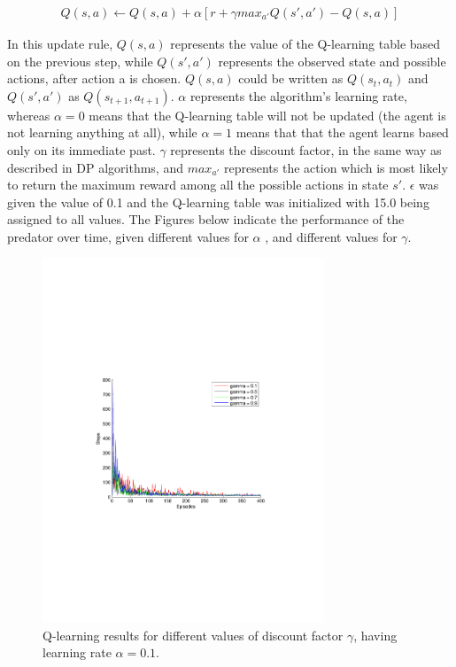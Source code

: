 \documentclass[a4paper,11pt]{article}
\begin{document}
\begin{align*}
Q(s,a) \leftarrow  Q(s,a) + \alpha \left[ r + \gamma  max_{a'} Q(s',a') - Q(s,a)\right]
\end{align*}

In this update rule, $Q(s,a)$ represents the value of the Q-learning table based on the previous step, while $Q(s',a')$ represents the observed state and possible actions, after action a is chosen. $Q(s,a)$ could be written as $Q(s_t,a_t)$ and $Q(s',a')$ as $Q(s_{t+1}, a_{t+1})$. $\alpha$ represents the algorithm's learning rate, whereas $\alpha =0$ means that the Q-learning table will not be updated (the agent is not learning anything at all), while $\alpha =1$ means that that the agent learns based only on its immediate past. $\gamma$ represents the discount factor, in the same way as described in DP algorithms, and $max_{a'}$ represents the action which is most likely to return the maximum reward among all the possible actions in state $s'$. $\epsilon$ was given the value of 0.1 and the Q-learning table was initialized with 15.0 being assigned to all values. The Figures below indicate the performance of the predator over time, given different values for $\alpha$ , and different values for $\gamma$.
\begin{figure}[h!]
  \centering
    \includegraphics[trim=4cm 8.5cm 4cm 8.5cm,clip,width=0.75\textwidth]{figures/qla01.pdf}
    \caption{Q-learning results for different values of discount factor $\gamma$, having learning rate $\alpha = 0.1$.}
    \label{q01}
\end{figure}
\end{document}
